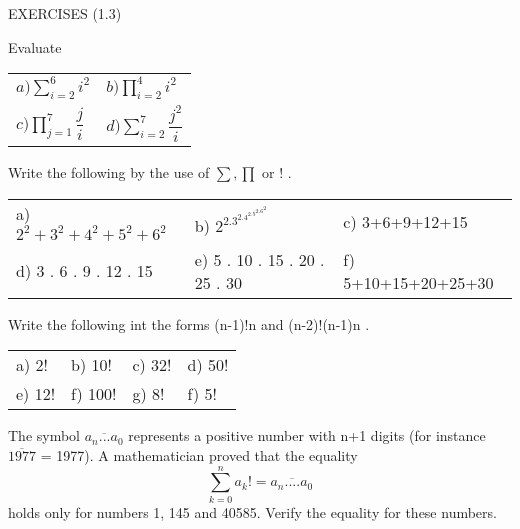 \documentclass[11pt]{amsbook}
\begin{document}
\begin{center}
EXERCISES (1.3)
\end{center}

\begin{exercise}
Evaluate

\begin{table}[ht]
\begin{tabular}{l l}
$ a) \sum_{i=2}^6 {i^2} $  & $ b) \prod_{i=2}^4 {i^2}$ \\[2ex]
$ c) \prod_{j=1}^7 {\dfrac{j}{i}} $ &  $ d) \sum_{i=2}^7 {\dfrac{j^2}{i}} $\\
\end{tabular}
\end{table}
\end{exercise}

\begin{exercise}
Write the following by the use of $\sum, \prod$ or ! .
\begin{table}[ht]
\begin{tabular}{l l l}
a) $2^2+3^2+4^2+5^2+6^2$  & b) $2^2.3^2.4^2.5^2.6^2$ & c) 3+6+9+12+15 \\[2ex]
 d) 3 . 6 . 9 . 12 . 15 & e) 5 . 10 . 15 . 20 . 25 . 30 & f) 5+10+15+20+25+30 \\
\end{tabular}
\end{table}
\end{exercise}

\begin{exercise}
Write the following int the forms (n-1)!n and (n-2)!(n-1)n .
\begin{table}[ht]
\begin{tabular}{l l l l}
a) 2! & b) 10! & c) 32! & d) 50! \\[2ex]
e) 12! & f) 100! & g) 8! & f) 5! \\
\end{tabular}
\end{table}
\end{exercise}

\begin{exercise}
The symbol $ \overline{a_n...a_0}$ represents a positive number with n+1 digits (for instance $\overline{1977}$ = 1977). A mathematician proved that the equality
\[
	\sum_{k=0}^n {a_k!} = \overline{a_n....a_0}
\]
holds only for numbers 1, 145 and 40585. Verify the equality for these numbers.
\end{exercise}
\end{document}
